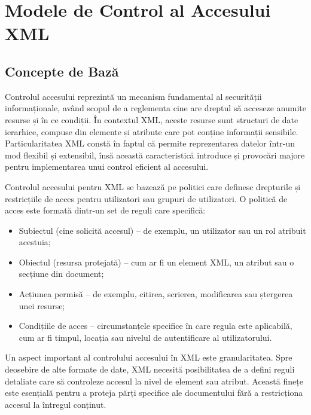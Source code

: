 \documentclass[runningheads]{llncs}
\begin{document}

\section{Modele de Control al Accesului XML}



\subsection{Concepte de Bază}

Controlul accesului reprezintă un mecanism fundamental al securității informa\-ționale, având scopul de a reglementa cine are dreptul să acceseze anumite resurse și în ce condiții. În contextul XML, aceste resurse sunt structuri de date ierarhice, compuse din elemente și atribute care pot conține informații sensibile. Particularitatea XML constă în faptul că permite reprezentarea datelor într-un mod flexibil și extensibil, însă această caracteristică introduce și provocări majore pentru implementarea unui control eficient al accesului.

Controlul accesului pentru XML se bazează pe politici care definesc drepturile și restricțiile de acces pentru utilizatori sau grupuri de utilizatori. O politică de acces este formată dintr-un set de reguli care specifică:

\begin{itemize}

    \item Subiectul (cine solicită accesul) – de exemplu, un utilizator sau un rol atribuit acestuia;

    \item Obiectul (resursa protejată) – cum ar fi un element XML, un atribut sau o secțiune din document;
    
    \item Acțiunea permisă – de exemplu, citirea, scrierea, modificarea sau ștergerea unei resurse;
    
    \item Condițiile de acces – circumstanțele specifice în care regula este aplicabilă, cum ar fi timpul, locația sau nivelul de autentificare al utilizatorului.
    
\end{itemize}

Un aspect important al controlului accesului în XML este granularitatea. Spre deosebire de alte formate de date, XML necesită posibilitatea de a defini reguli detaliate care să controleze accesul la nivel de element sau atribut. Această finețe este esențială pentru a proteja părți specifice ale documentului fără a restricționa accesul la întregul conținut.
\end{document}
